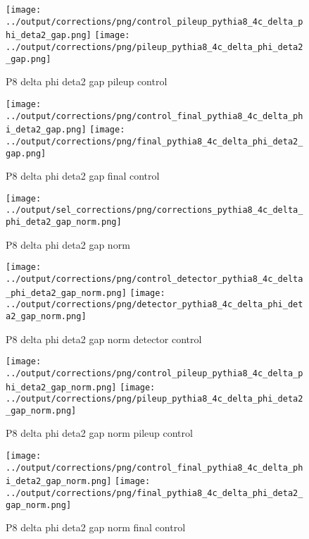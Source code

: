 \documentclass[11pt]{book}
\begin{document}
\begin{figure}[ht]
\centering
\texttt{[image: ../output/corrections/png/control\_pileup\_pythia8\_4c\_delta\_phi\_deta2\_gap.png]}
\texttt{[image: ../output/corrections/png/pileup\_pythia8\_4c\_delta\_phi\_deta2\_gap.png]}
\caption{P8 delta phi deta2 gap pileup control}
\label{fig:p8_delta_phi_deta2_gap_pileup_control}
\end{figure}


\begin{figure}[ht]
\centering
\texttt{[image: ../output/corrections/png/control\_final\_pythia8\_4c\_delta\_phi\_deta2\_gap.png]}
\texttt{[image: ../output/corrections/png/final\_pythia8\_4c\_delta\_phi\_deta2\_gap.png]}
\caption{P8 delta phi deta2 gap final control}
\label{fig:p8_delta_phi_deta2_gap_final_control}
\end{figure}

\begin{figure}[ht]
\centering
\texttt{[image: ../output/sel\_corrections/png/corrections\_pythia8\_4c\_delta\_phi\_deta2\_gap\_norm.png]}
\caption{P8 delta phi deta2 gap norm}
\label{fig:p8_delta_phi_deta2_gap_norm}
\end{figure}

\begin{figure}[ht]
\centering
\texttt{[image: ../output/corrections/png/control\_detector\_pythia8\_4c\_delta\_phi\_deta2\_gap\_norm.png]}
\texttt{[image: ../output/corrections/png/detector\_pythia8\_4c\_delta\_phi\_deta2\_gap\_norm.png]}
\caption{P8 delta phi deta2 gap norm detector control}
\label{fig:p8_delta_phi_deta2_gap_norm_detector_control}
\end{figure}

\begin{figure}[ht]
\centering
\texttt{[image: ../output/corrections/png/control\_pileup\_pythia8\_4c\_delta\_phi\_deta2\_gap\_norm.png]}
\texttt{[image: ../output/corrections/png/pileup\_pythia8\_4c\_delta\_phi\_deta2\_gap\_norm.png]}
\caption{P8 delta phi deta2 gap norm pileup control}
\label{fig:p8_delta_phi_deta2_gap_norm_pileup_control}
\end{figure}


\begin{figure}[ht]
\centering
\texttt{[image: ../output/corrections/png/control\_final\_pythia8\_4c\_delta\_phi\_deta2\_gap\_norm.png]}
\texttt{[image: ../output/corrections/png/final\_pythia8\_4c\_delta\_phi\_deta2\_gap\_norm.png]}
\caption{P8 delta phi deta2 gap norm final control}
\label{fig:p8_delta_phi_deta2_gap_norm_final_control}
\end{figure}
\end{document}
